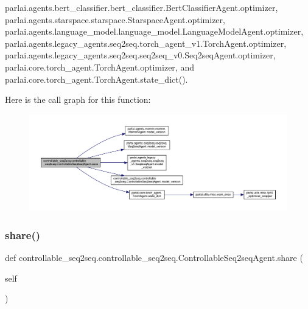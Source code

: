 parlai.\+agents.\+bert\+\_\+classifier.\+bert\+\_\+classifier.\+Bert\+Classifier\+Agent.\+optimizer, parlai.\+agents.\+starspace.\+starspace.\+Starspace\+Agent.\+optimizer, parlai.\+agents.\+language\+\_\+model.\+language\+\_\+model.\+Language\+Model\+Agent.\+optimizer, parlai.\+agents.\+legacy\+\_\+agents.\+seq2seq.\+torch\+\_\+agent\+\_\+v1.\+Torch\+Agent.\+optimizer, parlai.\+agents.\+legacy\+\_\+agents.\+seq2seq.\+seq2seq\+\_\+v0.\+Seq2seq\+Agent.\+optimizer, parlai.\+core.\+torch\+\_\+agent.\+Torch\+Agent.\+optimizer, and parlai.\+core.\+torch\+\_\+agent.\+Torch\+Agent.\+state\+\_\+dict().

Here is the call graph for this function\+:
\nopagebreak
\begin{figure}[H]
\begin{center}
\leavevmode
\includegraphics[width=350pt]{classcontrollable__seq2seq_1_1controllable__seq2seq_1_1ControllableSeq2seqAgent_abc818803e27d99525704db33cd4dd928_cgraph}
\end{center}
\end{figure}
\mbox{\label{classcontrollable__seq2seq_1_1controllable__seq2seq_1_1ControllableSeq2seqAgent_a153984d9d4758330a17f59ff6df1ac7c}} 
\subsubsection{\texorpdfstring{share()}{share()}}
{\footnotesize\ttfamily def controllable\+\_\+seq2seq.\+controllable\+\_\+seq2seq.\+Controllable\+Seq2seq\+Agent.\+share (\begin{DoxyParamCaption}\item[{}]{self }\end{DoxyParamCaption})}


